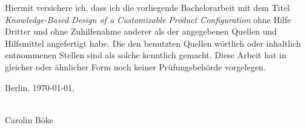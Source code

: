 
Hiermit versichere ich, dass ich die vorliegende Bachelorarbeit mit
dem Titel \textit{Knowledge-Based Design of a Customizable Product Configuration} ohne Hilfe Dritter und ohne Zuhilfenahme anderer als der angegebenen
Quellen und Hilfsmittel angefertigt habe. Die den benutzten Quellen
wörtlich oder inhaltlich entnommenen Stellen sind als solche kenntlich
gemacht. Diese Arbeit hat in gleicher oder ähnlicher Form noch keiner Prüfungsbehörde vorgelegen.

\vspace{35mm}
\noindent{}Berlin, \today,
\begin{minipage}[t]{8cm}
\centering \dotfill \\
Carolin Böke
\end{minipage}